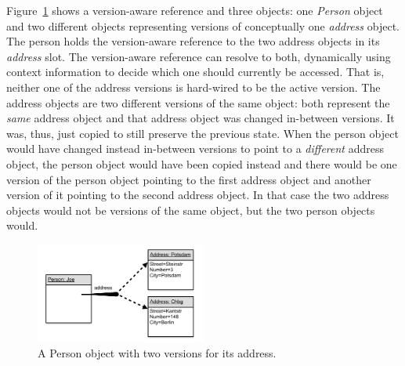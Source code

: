 Figure~\ref{fig:VersionAwareReference} shows a version-aware reference and three objects:
one \emph{Person} object and two different objects representing versions of conceptually one \emph{address} object.
The person holds the version-aware reference to the two address objects in its \emph{address} slot.
The version-aware reference can resolve to both, dynamically using context information to decide which one should currently be accessed.
That is, neither one of the address versions is hard-wired to be the active version.
The address objects are two different versions of the same object: both represent the \emph{same} address object and that address object was changed in-between versions.
It was, thus, just copied to still preserve the previous state.
When the person object would have changed instead in-between versions to point to a \emph{different} address object, the person object would have been copied instead and there would be one version of the person object pointing to the first address object and another version of it pointing to the second address object.
In that case the two address objects would not be versions of the same object, but the two person objects would.

\begin{figure}[h]
    \centering
    \includegraphics[width=0.5\textwidth]{figures/4_approach/versionAwareReference.png}
    \caption{A Person object with two versions for its address.}
    \label{fig:VersionAwareReference}
\end{figure}

